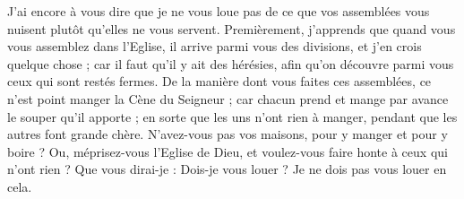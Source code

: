 J’ai encore à vous dire que je ne vous loue pas de ce que vos assemblées vous nuisent plutôt qu’elles ne vous servent. Premièrement, j’apprends que quand vous vous assemblez dans l’Eglise, il arrive parmi vous des divisions, et j’en crois quelque chose ; car il faut qu’il y ait des hérésies, afin qu’on découvre parmi vous ceux qui sont restés fermes.
De la manière dont vous faites ces assemblées, ce n’est point manger la Cène du Seigneur ; car chacun prend et mange par avance le souper qu’il apporte ; en sorte que les uns n’ont rien à manger, pendant que les autres font grande chère.
N’avez-vous pas vos maisons, pour y manger et pour y boire ? Ou, méprisez-vous l’Eglise de Dieu, et voulez-vous faire honte à ceux qui n’ont rien ? Que vous dirai-je : Dois-je vous louer ? Je ne dois pas vous louer en cela.